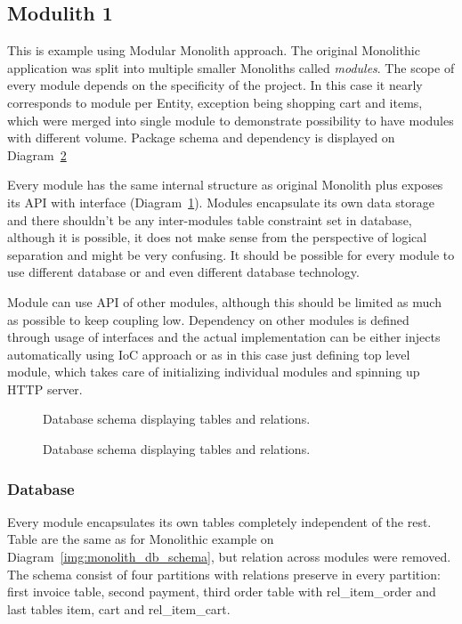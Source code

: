 \subsection{Modulith 1}
This is example using Modular Monolith approach. The original Monolithic application was split into multiple smaller Monoliths called \textit{modules}. The scope of every module depends on the specificity of the project. In this case it nearly corresponds to module per Entity, exception being shopping cart and items, which were merged into single module to demonstrate possibility to have modules with different volume. Package schema and dependency is displayed on Diagram~\ref{img:modulith_package}

Every module has the same internal structure as original Monolith plus exposes its API with interface (Diagram~\ref{img:modulith_module_package}). Modules encapsulate its own data storage and there shouldn't be any inter-modules table constraint set in database, although it is possible, it does not make sense from the perspective of logical separation and might be very confusing. It should be possible for every module to use different database or and even different database technology.

Module can use API of other modules, although this should be limited as much as possible to keep coupling low. Dependency on other modules is defined through usage of interfaces and the actual implementation can be either injects automatically using IoC approach or as in this case just defining top level module, which takes care of initializing individual modules and spinning up HTTP server.

\begin{figure}
    \centering
    
    \caption{Database schema displaying tables and relations. \label{img:modulith_module_package}}
\end{figure}

\begin{figure}
    \centering
    
    \caption{Database schema displaying tables and relations. \label{img:modulith_package}}
\end{figure}

\subsubsection{Database}
Every module encapsulates its own tables completely independent of the rest. Table are the same as for Monolithic example on Diagram~\ref{img:monolith_db_schema}, but relation across modules were removed. The schema consist of four partitions with relations preserve in every partition: first invoice table, second payment, third order table with rel\_item\_order and last tables item, cart and rel\_item\_cart.

